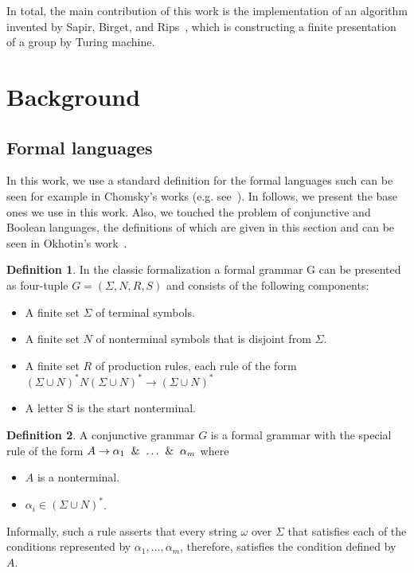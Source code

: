 \documentclass[conference]{IEEEtran}
\theoremstyle{definition}
\newtheorem{defn}{Definition}[section]
\begin{document}
In total, the main contribution of this work is the implementation of an algorithm invented by Sapir, Birget, and Rips~\cite{Sapir}, which is constructing a finite presentation of a group by Turing machine.

\section{Background}
\subsection{Formal languages}

In this work, we use a standard definition for the formal languages such can be seen
for example in Chomsky's works (e.g. see~\cite{chomsky1, chomsky2}).
In follows, we present the base ones we use in this work.
Also, we touched the problem of conjunctive and Boolean languages,
the definitions of which are given in this section
and can be seen in Okhotin's work~\cite{OKHOTIN201327}.

\begin{defn}
In the classic formalization a formal grammar G can be presented as four-tuple
$G = (\Sigma, N, R, S)$ and consists of the following components:
\begin{itemize}
    \item A finite set $\Sigma$ of terminal symbols.
    \item A finite set $N$ of nonterminal symbols that is disjoint from $\Sigma$.
    \item A finite set $R$ of production rules, each rule of the form
    $(\Sigma \cup N)^{*}N(\Sigma \cup N)^{*} \to (\Sigma \cup N)^{*}$
    \item A letter S is the start nonterminal.
\end{itemize}
\end{defn}

\begin{defn}
A conjunctive grammar $G$ is a formal grammar with the special rule
of the form
$\\A \to \alpha_{1}\And \ldots \And \alpha_{m}$ where
\begin{itemize}
    \item $A$ is a nonterminal.
    \item $\alpha_{i} \in (\Sigma \cup N)^*$.
\end{itemize}
Informally, such a rule asserts that every string $\omega$ over $\Sigma$ that satisfies each of the conditions represented by $\alpha _{1}, \dots, \alpha _{m}$, therefore, satisfies the condition defined by $A$.
\end{defn}
\end{document}
